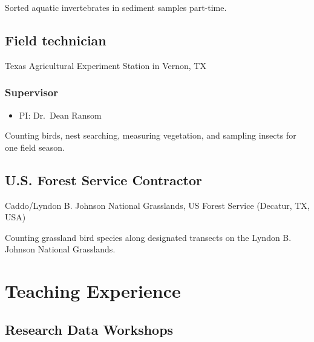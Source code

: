 \documentclass[
  letterpaper,
  DIV=11,
  numbers=noendperiod,
  oneside]{scrreprt}
\providecommand{\tightlist}{%
  \setlength{\itemsep}{0pt}\setlength{\parskip}{0pt}}\usepackage{longtable,booktabs,array}
\begin{document}
Sorted aquatic invertebrates in sediment samples part-time.

\section{Field technician}\label{field-technician}

Texas Agricultural Experiment Station in Vernon, TX


\subsection{Supervisor}\label{supervisor-5}

\begin{itemize}
\tightlist
\item
  PI: Dr.~Dean Ransom
\end{itemize}

Counting birds, nest searching, measuring vegetation, and sampling
insects for one field season.

\section{U.S. Forest Service
Contractor}\label{u.s.-forest-service-contractor-1}

Caddo/Lyndon B. Johnson National Grasslands, US Forest Service (Decatur,
TX, USA)


Counting grassland bird species along designated transects on the Lyndon
B. Johnson National Grasslands.


\chapter{Teaching Experience}\label{teaching-experience}

\section{Research Data Workshops}\label{research-data-workshops}
\end{document}
